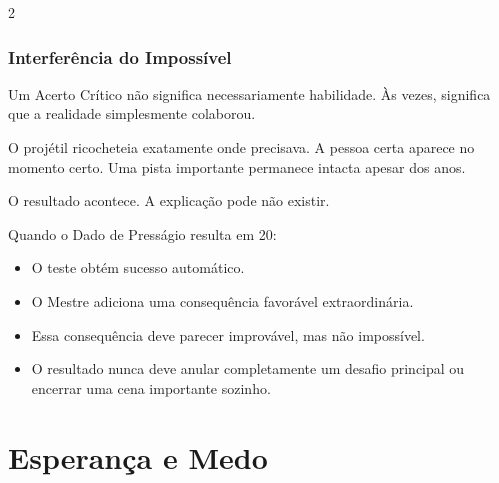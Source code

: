\documentclass[a4paper,11pt,openany]{book}
\begin{document}
\begin{multicols}{2}
\subsection{Interferência do Impossível}

Um Acerto Crítico não significa necessariamente habilidade. Às vezes, significa que a realidade simplesmente colaborou.

O projétil ricocheteia exatamente onde precisava. A pessoa certa aparece no momento certo. Uma pista importante permanece intacta apesar dos anos.

O resultado acontece. A explicação pode não existir.

\begin{regra}
Quando o Dado de Presságio resulta em 20:
\begin{itemize}
\item O teste obtém sucesso automático.
\item O Mestre adiciona uma consequência favorável extraordinária.
\item Essa consequência deve parecer improvável, mas não impossível.
\item O resultado nunca deve anular completamente um desafio principal ou encerrar uma cena importante sozinho.
\end{itemize}
\end{regra}

\end{multicols}


\chapter{Esperança e Medo}
\end{document}
